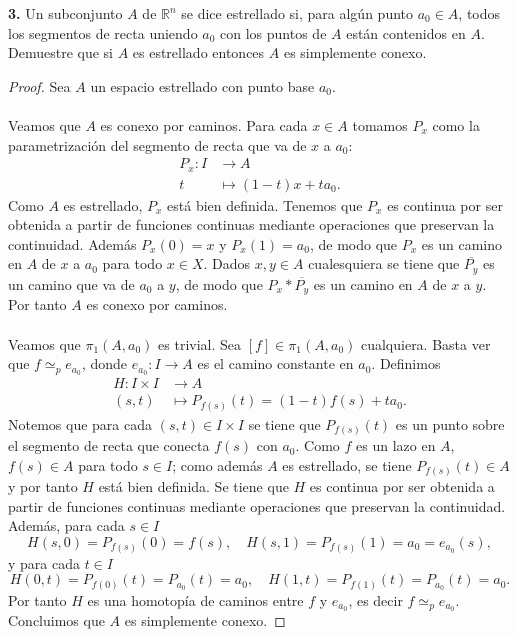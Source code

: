 \textbf{3.} Un subconjunto $A$ de $\mathbb{R}^n$ se dice estrellado si, para algún punto $a_0\in A$, todos los segmentos de recta uniendo $a_0$ con los puntos de $A$ están contenidos en $A$. Demuestre que si $A$ es estrellado entonces $A$ es simplemente conexo.
\begin{proof}
   Sea $A$ un espacio estrellado con punto base $a_0$.\\\\
   Veamos que $A$ es conexo por caminos. Para cada $x\in A$ tomamos $P_x$ como la parametrización del segmento de recta que va de $x$ a $a_0$:
   \[
   \begin{aligned}
   P_x \colon I &\longrightarrow A \\
              t &\longmapsto (1-t)x+ta_0.
   \end{aligned}
   \]
   Como $A$ es estrellado, $P_x$ está bien definida. Tenemos que $P_x$ es continua por ser obtenida a partir de funciones continuas mediante operaciones que preservan la continuidad. Además $P_x(0)=x$ y $P_x(1)=a_0$, de modo que $P_x$ es un camino en $A$ de $x$ a $a_0$ para todo $x\in X$. Dados $x,y\in A$ cualesquiera se tiene que $\overline{P_y}$ es un camino que va de $a_0$ a $y$, de modo que $P_x*\overline{P_y}$ es un camino en $A$ de $x$ a $y$. Por tanto $A$ es conexo por caminos.\\\\
   Veamos que $\pi_1(A,a_0)$ es trivial. Sea $[f]\in\pi_1(A,a_0)$ cualquiera. Basta ver que $f\simeq_p e_{a_0}$, donde $e_{a_0}:I\to A$ es el camino constante en $a_0$. Definimos
   \[
   \begin{aligned}
   H \colon I \times I &\longrightarrow A \\
                 (s,t) &\longmapsto P_{f(s)}(t)=(1-t)f(s)+ta_0.
   \end{aligned}
   \]
   Notemos que para cada $(s,t)\in I\times I$ se tiene que $P_{f(s)}(t)$ es un punto sobre el segmento de recta que conecta $f(s)$ con $a_0$. Como $f$ es un lazo en $A$, $f(s)\in A$ para todo $s\in I$; como además $A$ es estrellado, se tiene $P_{f(s)}(t)\in A$ y por tanto $H$ está bien definida. Se tiene que $H$ es continua por ser obtenida a partir de funciones continuas mediante operaciones que preservan la continuidad. Además, para cada $s\in I$
   $$
   H(s,0)=P_{f(s)}(0)=f(s),\quad H(s,1)=P_{f(s)}(1)=a_0=e_{a_0}(s),
   $$
   y para cada $t\in I$
   $$
   H(0,t)=P_{f(0)}(t)=P_{a_0}(t)=a_0, \quad H(1,t)=P_{f(1)}(t)=P_{a_0}(t)=a_0.   
   $$
   Por tanto $H$ es una homotopía de caminos entre $f$ y $e_{a_0}$, es decir $f\simeq_p e_{a_0}$.
   Concluimos que $A$ es simplemente conexo.
\end{proof}

